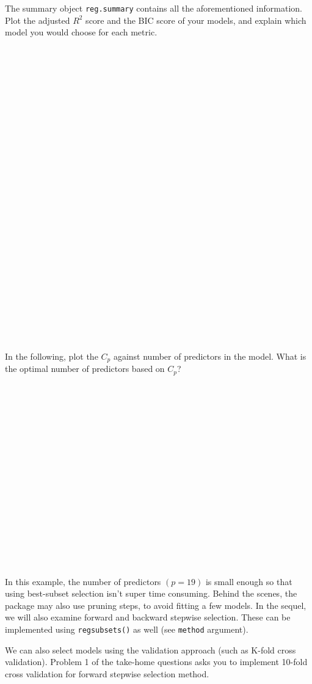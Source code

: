 \documentclass{article}
\begin{document}
\begin{Verbatim}[frame=single]







\end{Verbatim}

\newpage
The summary object \texttt{reg.summary} contains all the aforementioned
information. Plot the adjusted $R^2$ score and the BIC score of your models,
and explain which model you would choose for each metric. 

\begin{Verbatim}[frame=single]






























\end{Verbatim}

\newpage
In the following, plot the $C_p$ against number of predictors in the model.
What is the optimal number of predictors based on $C_p$?
\begin{Verbatim}[frame=single]



















\end{Verbatim}

In this example, the number of predictors $(p = 19)$ is small enough so that
using best-subset selection isn't super time consuming. Behind the scenes, the package may also use
pruning steps, to avoid fitting a few models. In the sequel, we will also
examine forward and backward stepwise selection. These can be implemented
using \texttt{regsubsets()} as well (see \texttt{method} argument).


\bigskip
We can also select models using the validation approach (such as K-fold cross
validation). Problem 1 of the take-home questions asks you to implement 10-fold
cross validation for forward stepwise selection method.
\end{document}
